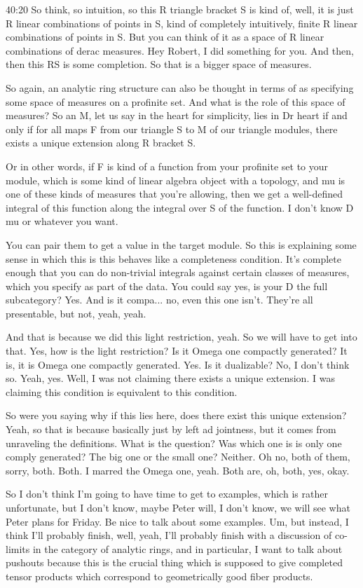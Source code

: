 \begin{unfinished}{40:20}
So think, so intuition, so this R triangle bracket S is kind of, well, it is just R linear combinations of points in S, kind of completely intuitively, finite R linear combinations of points in S. But you can think of it as a space of R linear combinations of derac measures. Hey Robert, I did something for you. And then, then this RS is some completion. So that is a bigger space of measures. 

So again, an analytic ring structure can also be thought in terms of as specifying some space of measures on a profinite set. And what is the role of this space of measures? So an M, let us say in the heart for simplicity, lies in Dr heart if and only if for all maps F from our triangle S to M of our triangle modules, there exists a unique extension along R bracket S. 

Or in other words, if F is kind of a function from your profinite set to your module, which is some kind of linear algebra object with a topology, and mu is one of these kinds of measures that you're allowing, then we get a well-defined integral of this function along the integral over S of the function. I don't know D mu or whatever you want. 

You can pair them to get a value in the target module. So this is explaining some sense in which this is this behaves like a completeness condition. It's complete enough that you can do non-trivial integrals against certain classes of measures, which you specify as part of the data. You could say yes, is your D the full subcategory? Yes. And is it compa... no, even this one isn't. They're all presentable, but not, yeah, yeah. 

And that is because we did this light restriction, yeah. So we will have to get into that. Yes, how is the light restriction? Is it Omega one compactly generated? It is, it is Omega one compactly generated. Yes. Is it dualizable? No, I don't think so. Yeah, yes. Well, I was not claiming there exists a unique extension. I was claiming this condition is equivalent to this condition. 

So were you saying why if this lies here, does there exist this unique extension? Yeah, so that is because basically just by left ad jointness, but it comes from unraveling the definitions. What is the question? Was which one is is only one comply generated? The big one or the small one? Neither. Oh no, both of them, sorry, both. Both. I marred the Omega one, yeah. Both are, oh, both, yes, okay. 

So I don't think I'm going to have time to get to examples, which is rather unfortunate, but I don't know, maybe Peter will, I don't know, we will see what Peter plans for Friday. Be nice to talk about some examples. Um, but instead, I think I'll probably finish, well, yeah, I'll probably finish with a discussion of co-limits in the category of analytic rings, and in particular, I want to talk about pushouts because this is the crucial thing which is supposed to give completed tensor products which correspond to geometrically good fiber products. 


\end{unfinished}
